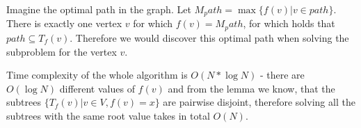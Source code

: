 Imagine the optimal path in the graph. Let $M_path = \max\{f(v) | v \in path\}$.
There is exactly one vertex $v$ for which $f(v) = M_path$,
for which holds that $path \subseteq T_f(v)$. Therefore we would discover this
optimal path when solving the subproblem for the vertex $v$.

Time complexity of the whole algorithm is $O(N * \log N)$ - there are $O(\log N)$ different values of $f(v)$
and from the lemma we know, that the subtrees $\{T_f(v) | v \in V, f(v) = x\}$ are
pairwise disjoint, therefore solving all the subtrees with the same root value takes in total $O(N)$.

